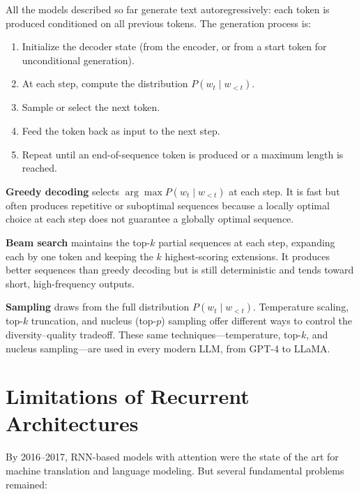 All the models described so far generate text autoregressively: each token is produced conditioned on all previous tokens. The generation process is:

\begin{enumerate}
    \item Initialize the decoder state (from the encoder, or from a start token for unconditional generation).
    \item At each step, compute the distribution $P(w_t \mid w_{<t})$.
    \item Sample or select the next token.
    \item Feed the token back as input to the next step.
    \item Repeat until an end-of-sequence token is produced or a maximum length is reached.
\end{enumerate}

\textbf{Greedy decoding} selects $\arg\max P(w_t \mid w_{<t})$ at each step. It is fast but often produces repetitive or suboptimal sequences because a locally optimal choice at each step does not guarantee a globally optimal sequence.

\textbf{Beam search} maintains the top-$k$ partial sequences at each step, expanding each by one token and keeping the $k$ highest-scoring extensions. It produces better sequences than greedy decoding but is still deterministic and tends toward short, high-frequency outputs.

\textbf{Sampling} draws from the full distribution $P(w_t \mid w_{<t})$. Temperature scaling, top-$k$ truncation, and nucleus (top-$p$) sampling offer different ways to control the diversity--quality tradeoff. These same techniques---temperature, top-$k$, and nucleus sampling---are used in every modern LLM, from GPT-4 to LLaMA.

\section{Limitations of Recurrent Architectures}

By 2016--2017, RNN-based models with attention were the state of the art for machine translation and language modeling. But several fundamental problems remained:

